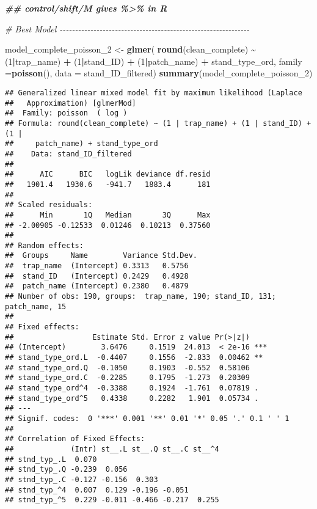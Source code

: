 \documentclass[
]{article}
\newenvironment{Shaded}{\begin{snugshade}}{\end{snugshade}}
\newcommand{\AttributeTok}[1]{\textcolor[rgb]{0.13,0.29,0.53}{#1}}
\newcommand{\CommentTok}[1]{\textcolor[rgb]{0.56,0.35,0.01}{\textit{#1}}}
\newcommand{\DecValTok}[1]{\textcolor[rgb]{0.00,0.00,0.81}{#1}}
\newcommand{\DocumentationTok}[1]{\textcolor[rgb]{0.56,0.35,0.01}{\textbf{\textit{#1}}}}
\newcommand{\FunctionTok}[1]{\textcolor[rgb]{0.13,0.29,0.53}{\textbf{#1}}}
\newcommand{\NormalTok}[1]{#1}
\newcommand{\OtherTok}[1]{\textcolor[rgb]{0.56,0.35,0.01}{#1}}
\newcommand{\SpecialCharTok}[1]{\textcolor[rgb]{0.81,0.36,0.00}{\textbf{#1}}}
\begin{document}
\begin{Shaded}
\begin{Highlighting}[]
\DocumentationTok{\#\# control/shift/M gives \textquotesingle{}\%\textgreater{}\%\textquotesingle{} in R}


\CommentTok{\# Best Model {-}{-}{-}{-}{-}{-}{-}{-}{-}{-}{-}{-}{-}{-}{-}{-}{-}{-}{-}{-}{-}{-}{-}{-}{-}{-}{-}{-}{-}{-}{-}{-}{-}{-}{-}{-}{-}{-}{-}{-}{-}{-}{-}{-}{-}{-}{-}{-}{-}{-}{-}{-}{-}{-}{-}{-}{-}{-}{-}{-}{-}{-}}

\NormalTok{model\_complete\_poisson\_2 }\OtherTok{\textless{}{-}} \FunctionTok{glmer}\NormalTok{(}
  \FunctionTok{round}\NormalTok{(clean\_complete) }\SpecialCharTok{\textasciitilde{}}\NormalTok{ (}\DecValTok{1}\SpecialCharTok{|}\NormalTok{trap\_name) }
  \SpecialCharTok{+}\NormalTok{ (}\DecValTok{1}\SpecialCharTok{|}\NormalTok{stand\_ID) }\SpecialCharTok{+} 
\NormalTok{    (}\DecValTok{1}\SpecialCharTok{|}\NormalTok{patch\_name) }\SpecialCharTok{+}\NormalTok{ stand\_type\_ord, }
  \AttributeTok{family =}\FunctionTok{poisson}\NormalTok{(), }\AttributeTok{data =}\NormalTok{ stand\_ID\_filtered)}
\FunctionTok{summary}\NormalTok{(model\_complete\_poisson\_2)}
\end{Highlighting}
\end{Shaded}

\begin{verbatim}
## Generalized linear mixed model fit by maximum likelihood (Laplace
##   Approximation) [glmerMod]
##  Family: poisson  ( log )
## Formula: round(clean_complete) ~ (1 | trap_name) + (1 | stand_ID) + (1 |  
##     patch_name) + stand_type_ord
##    Data: stand_ID_filtered
## 
##      AIC      BIC   logLik deviance df.resid 
##   1901.4   1930.6   -941.7   1883.4      181 
## 
## Scaled residuals: 
##      Min       1Q   Median       3Q      Max 
## -2.00905 -0.12533  0.01246  0.10213  0.37560 
## 
## Random effects:
##  Groups     Name        Variance Std.Dev.
##  trap_name  (Intercept) 0.3313   0.5756  
##  stand_ID   (Intercept) 0.2429   0.4928  
##  patch_name (Intercept) 0.2380   0.4879  
## Number of obs: 190, groups:  trap_name, 190; stand_ID, 131; patch_name, 15
## 
## Fixed effects:
##                  Estimate Std. Error z value Pr(>|z|)    
## (Intercept)        3.6476     0.1519  24.013  < 2e-16 ***
## stand_type_ord.L  -0.4407     0.1556  -2.833  0.00462 ** 
## stand_type_ord.Q  -0.1050     0.1903  -0.552  0.58106    
## stand_type_ord.C  -0.2285     0.1795  -1.273  0.20309    
## stand_type_ord^4  -0.3388     0.1924  -1.761  0.07819 .  
## stand_type_ord^5   0.4338     0.2282   1.901  0.05734 .  
## ---
## Signif. codes:  0 '***' 0.001 '**' 0.01 '*' 0.05 '.' 0.1 ' ' 1
## 
## Correlation of Fixed Effects:
##             (Intr) st__.L st__.Q st__.C st__^4
## stnd_typ_.L  0.070                            
## stnd_typ_.Q -0.239  0.056                     
## stnd_typ_.C -0.127 -0.156  0.303              
## stnd_typ_^4  0.007  0.129 -0.196 -0.051       
## stnd_typ_^5  0.229 -0.011 -0.466 -0.217  0.255
\end{verbatim}
\end{document}
